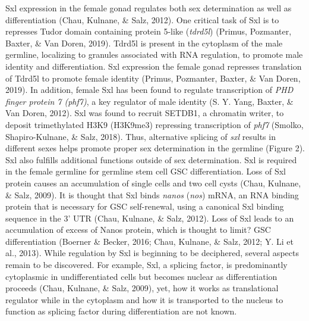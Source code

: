 \documentclass[12pt,oneside]{reedthesis}
\begin{document}
Sxl expression in the female gonad regulates both sex determination as
well as differentiation (Chau, Kulnane, \& Salz, 2012). One critical task of Sxl is to
represses Tudor domain containing protein 5-like (\emph{tdrd5l})
(Primus, Pozmanter, Baxter, \& Van Doren, 2019). Tdrd5l is present in the cytoplasm of the male
germline, localizing to granules associated with RNA regulation, to
promote male identity and differentiation. Sxl expression the female
gonad represses translation of Tdrd5l to promote female identity
(Primus, Pozmanter, Baxter, \& Van Doren, 2019). In addition, female Sxl has been found to regulate
transcription of \emph{PHD finger protein 7 (phf7)}, a key regulator of male
identity (S. Y. Yang, Baxter, \& Van Doren, 2012). Sxl was found to recruit SETDB1, a chromatin
writer, to deposit trimethylated H3K9 (H3K9me3) repressing transcription
of \emph{phf7} (Smolko, Shapiro-Kulnane, \& Salz, 2018). Thus, alternative splicing of \emph{sxl} results
in different sexes helps promote proper sex determination in the
germline (Figure 2). Sxl also fulfills additional functions outside of
sex determination. Sxl is required in the female germline for germline
stem cell GSC differentiation. Loss of Sxl protein causes an
accumulation of single cells and two cell cysts (Chau, Kulnane, \& Salz, 2009). It is
thought that Sxl binds \emph{nanos} (\emph{nos}) mRNA, an RNA binding protein that
is necessary for GSC self-renewal, using a canonical Sxl binding
sequence in the 3' UTR (Chau, Kulnane, \& Salz, 2012). Loss of Sxl leads to an
accumulation of excess of Nanos protein, which is thought to limit? GSC
differentiation (Boerner \& Becker, 2016; Chau, Kulnane, \& Salz, 2012; Y. Li et al., 2013). While
regulation by Sxl is beginning to be deciphered, several aspects remain
to be discovered. For example, Sxl, a splicing factor, is predominantly
cytoplasmic in undifferentiated cells but becomes nuclear as
differentiation proceeds (Chau, Kulnane, \& Salz, 2009), yet, how it works as
translational regulator while in the cytoplasm and how it is transported
to the nucleus to function as splicing factor during differentiation are
not known.
\end{document}
